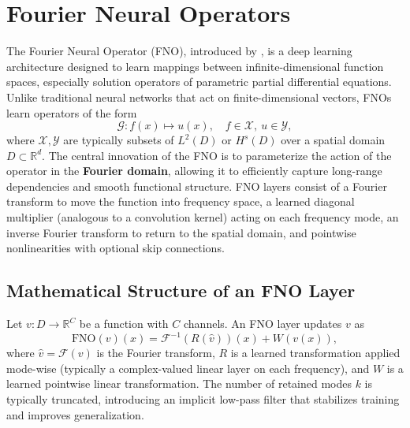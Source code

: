 \documentclass[11pt]{article}
\theoremstyle{plain}
\theoremstyle{definition}
\theoremstyle{remark}
\begin{document}
\section{Fourier Neural Operators}
\label{appendix:fno}
The Fourier Neural Operator (FNO), introduced by \citet{li2020fourier}, is a
deep learning architecture designed to learn mappings between
infinite-dimensional function spaces, especially solution operators of
parametric partial differential equations. Unlike traditional neural networks
that act on finite-dimensional vectors, FNOs learn operators of the form
\[
\mathcal{G}: f(x) \mapsto u(x), \quad f \in \mathcal{X},\ u \in \mathcal{Y},
\]
where $\mathcal{X}, \mathcal{Y}$ are typically subsets of $L^2(D)$ or $H^s(D)$
over a spatial domain $D \subset \mathbb{R}^d$. The central innovation of the
FNO is to parameterize the action of the operator in the \textbf{Fourier
domain}, allowing it to efficiently capture long-range dependencies and smooth
functional structure. FNO layers consist of a Fourier transform to move the
function into frequency space, a learned diagonal multiplier (analogous to a
convolution kernel) acting on each frequency mode, an inverse Fourier
transform to return to the spatial domain, and pointwise nonlinearities with
optional skip connections.

\subsection{Mathematical Structure of an FNO Layer}
Let $v: D \to \mathbb{R}^C$ be a function with $C$ channels. An FNO layer
updates $v$ as
\[
\text{FNO}(v)(x) = \mathcal{F}^{-1}\left( R(\hat{v}) \right)(x) + W(v(x)),
\]
where $\hat{v} = \mathcal{F}(v)$ is the Fourier transform, $R$ is a learned
transformation applied mode-wise (typically a complex-valued linear layer on
each frequency), and $W$ is a learned pointwise linear transformation. The
number of retained modes $k$ is typically truncated, introducing an implicit
low-pass filter that stabilizes training and improves generalization.
\end{document}
